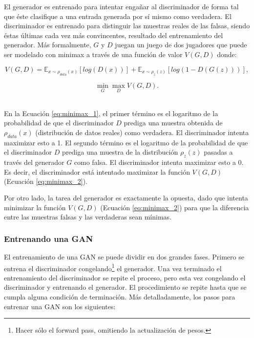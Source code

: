 \documentclass[spanish]{report}
\begin{document}
El generador es entrenado para intentar engañar al discriminador de forma tal que éste clasifique a una entrada generada por sí mismo como verdadera. El discriminador es entrenado para distinguir las muestras reales de las falsas, siendo éstas últimas cada vez más convincentes, resultado del entrenamiento del generador. Más formalmente, $G$ y $D$ juegan un juego de dos jugadores que puede ser modelado con minimax a través de una función de valor $V(G, D)$ donde:

\begin{equation}\label{eq:minimax_1}
V(G, D) = \mathds{E}_{x\sim\rho_{data}(x)}[log(D(x))] + \mathds{E}_{x\sim\rho_{z}(z)}[log(1 - D(G(z)))],
\end{equation}

\begin{equation}\label{eq:minimax_2}
\min_{G}\max_{D} V(G, D).
\end{equation}

~\\
En la Ecuación \ref{eq:minimax_1}, el primer término es el logaritmo de la probabilidad de que el discriminador $D$ prediga una muestra obtenida de $\rho_{data}(x)$ (distribución de datos reales) como verdadera. El discriminador intenta maximizar esto a 1. El segundo término es el logaritmo de la probabilidad de que el discriminador $D$ prediga una muestra de la distribución $\rho_{z}(z)$ pasadas a través del generador $G$ como falsa. El discriminador intenta maximizar esto a 0. Es decir, el discriminador está intentado maximizar la función $V(G, D)$ (Ecuación \ref{eq:minimax_2}).

Por otro lado, la tarea del generador es exactamente la opuesta, dado que intenta minimizar la función $V(G, D)$ (Ecuación \ref{eq:minimax_2}) para que la diferencia entre las muestras falsas y las verdaderas sean mínimas.

\subsubsection{Entrenando una GAN}

El entrenamiento de una GAN se puede dividir en dos grandes fases. Primero se entrena el discriminador congelando\footnote{Hacer sólo el forward pass, omitiendo la actualización de pesos.} el generador. Una vez terminado el entrenamiento del discriminador se repite el proceso, pero esta vez congelando el discriminador y entrenando el generador. El procedimiento se repite hasta que se cumpla alguna condición de terminación. Más detalladamente, los pasos para entrenar una GAN son los siguientes:
\end{document}
